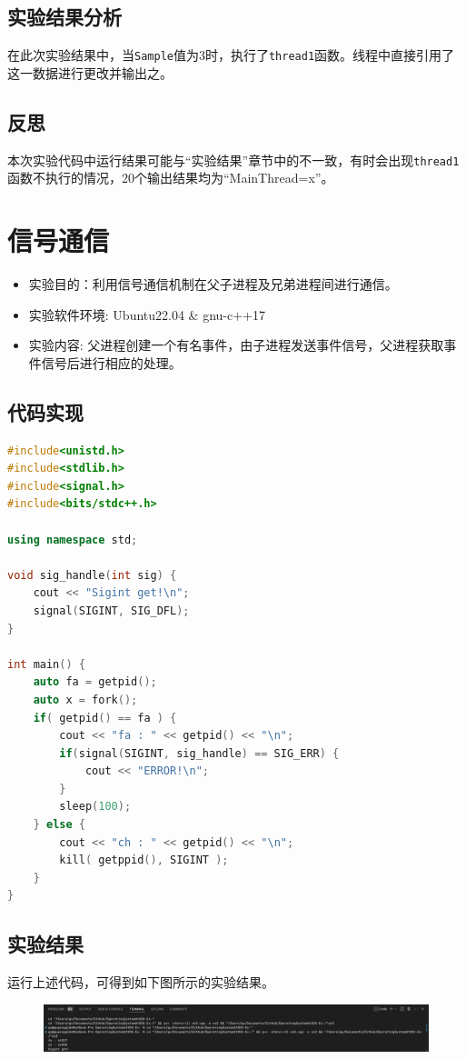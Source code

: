 \documentclass[UTF8]{ctexart}
\begin{document}
\subsection{实验结果分析}
在此次实验结果中，当\texttt{Sample}值为3时，执行了\texttt{thread1}函数。线程中直接引用了这一数据进行更改并输出之。
\subsection{反思}
本次实验代码中运行结果可能与“实验结果”章节中的不一致，有时会出现\texttt{thread1}函数不执行的情况，20个输出结果均为“MainThread=x”。
\section{信号通信}
\begin{itemize}
	\item 实验目的：利用信号通信机制在父子进程及兄弟进程间进行通信。
	\item 实验软件环境: Ubuntu22.04 \& gnu-c++17
	\item 实验内容: 父进程创建一个有名事件，由子进程发送事件信号，父进程获取事件信号后进行相应的处理。
\end{itemize}
\subsection{代码实现}
\begin{lstlisting}[language=c++]
#include<unistd.h>
#include<stdlib.h>
#include<signal.h>
#include<bits/stdc++.h>

using namespace std;

void sig_handle(int sig) {
	cout << "Sigint get!\n";
	signal(SIGINT, SIG_DFL);
}
	
int main() {
	auto fa = getpid();
	auto x = fork();
	if( getpid() == fa ) {
		cout << "fa : " << getpid() << "\n";
		if(signal(SIGINT, sig_handle) == SIG_ERR) {
			cout << "ERROR!\n";
		}
		sleep(100);
	} else {
		cout << "ch : " << getpid() << "\n";
		kill( getppid(), SIGINT );
	} 
}
\end{lstlisting}
\subsection{实验结果}
运行上述代码，可得到如下图所示的实验结果。
\begin{figure}[htbp]
	\begin{center}
		\includegraphics[width=0.8\pdfpagewidth]{os3-1.png}
	\end{center}
\end{figure}
\end{document}

